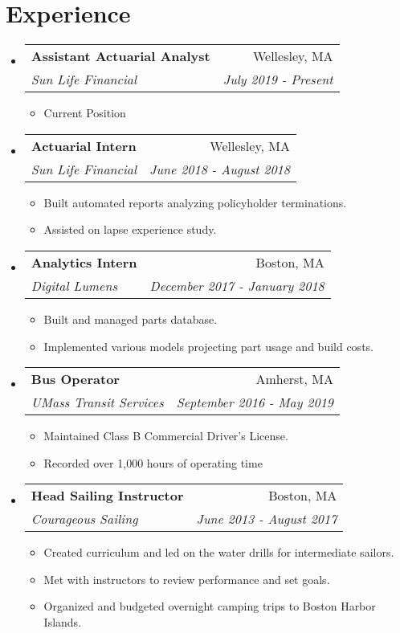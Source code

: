 \documentclass[letterpaper,11pt]{article}
\makeatletter
\newcommand{\resumeItem}[1]{\item\small{
  {#1}
  }
}
\newcommand{\resumeSubheading}[4]{
  \vspace{-1pt}\item
  \begin{tabular*}{0.97\textwidth}{l@{\extracolsep{\fill}}r}
  \textbf{#1} & #2 \\
  \textit{\small#3} & \textit{\small #4} \\
  \end{tabular*}\vspace{-5pt}
}
\newcommand{\resumeSubHeadingListStart}{\begin{itemize}[leftmargin=*]}
\newcommand{\resumeSubHeadingListEnd}{\end{itemize}}
\newcommand{\resumeItemListStart}{\begin{itemize}}
\newcommand{\resumeItemListEnd}{\end{itemize}\vspace{-5pt}}
\makeatother
\begin{document}
\section{Experience}
    \resumeSubHeadingListStart
    
        \resumeSubheading
            {Assistant Actuarial Analyst}{Wellesley, MA}
            {Sun Life Financial}{July 2019 - Present}
            \resumeItemListStart
                \resumeItem{Current Position}
            \resumeItemListEnd
            
   	\resumeSubheading
    	    {Actuarial Intern}{Wellesley, MA}
            {Sun Life Financial}{June 2018 - August 2018}
            \resumeItemListStart 
            	\resumeItem{Built automated reports analyzing policyholder terminations.}
                	\resumeItem{Assisted on lapse experience study.}
            \resumeItemListEnd
            
    	\resumeSubheading
    	    {Analytics Intern}{Boston, MA}
            {Digital Lumens}{December 2017 - January 2018}
            \resumeItemListStart
          	\resumeItem{Built and managed parts database.}
    	   	\resumeItem{Implemented various models projecting part usage and build costs.}
            \resumeItemListEnd
            
        \resumeSubheading
            {Bus Operator}{Amherst, MA}
            {UMass Transit Services}{September 2016 - May 2019}
            \resumeItemListStart
            	\resumeItem{Maintained Class B Commercial Driver's License.}
		\resumeItem{Recorded over 1,000 hours of operating time}
       	    \resumeItemListEnd
    	
    	\resumeSubheading
            {Head Sailing Instructor}{Boston, MA}
            {Courageous Sailing}{June 2013 - August 2017}
            \resumeItemListStart
            	\resumeItem{Created curriculum and led on the water drills for intermediate sailors.}
		\resumeItem{Met with instructors to review performance and set goals.}
		\resumeItem{Organized and budgeted overnight camping trips to Boston Harbor Islands.}
            \resumeItemListEnd

\resumeSubHeadingListEnd
\end{document}
